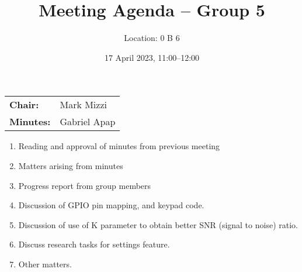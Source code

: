 \documentclass[11pt,a4paper]{scrartcl}
\title{Meeting Agenda -- Group 5}
\author{Location: 0 B 6}
\date{17 April 2023, 11:00--12:00}
\begin{document}
\maketitle
\begin{center}
\begin{tabular}{ll}
\textbf{Chair:}   & Mark Mizzi \\
\textbf{Minutes:} & Gabriel Apap
\end{tabular}
\end{center}

\begin{enumerate}

\item Reading and approval of minutes from previous meeting

\item Matters arising from minutes

\item Progress report from group members

\item Discussion of GPIO pin mapping, and keypad code.

\item Discussion of use of K parameter to obtain better SNR (signal to noise) ratio.

\item Discuss research tasks for settings feature.

\item Other matters.

\end{enumerate}
\end{document}
